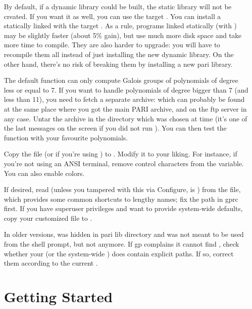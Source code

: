 By default, if a dynamic library  could be built, the static
library  will not be created. If you want it as well, you can
use the target . You can install a statically
linked  with the target . As a rule,
programs linked statically (with ) may be slightly faster
(about 5\% gain), but use much more disk space and take more time to compile.
They are also harder to upgrade: you will have to recompile them all instead
of just installing the new dynamic library. On the other hand, there's no
risk of breaking them by installing a new pari library.

 The default  function can only
compute Galois groups of polynomials of degree less or equal to 7. If you
want to handle polynomials of degree bigger than 7 (and less than 11), you
need to fetch a separate archive:  which can probably be
found at the same place where you got the main PARI archive, and on the
 ftp server in any case. Untar the archive in the 
directory which was chosen at  time (it's one of the last
messages on the screen if you did not run ). You can then
test the  function with your favourite polynomials.

 Copy the file  (or
 if you're using ) to . Modify
it to your liking. For instance, if you're not using an ANSI terminal,
remove control characters from the  variable. You can also
enable colors. 

If desired, read  (unless you tampered with this via
Configure,  is ) from the 
file, which provides some common shortcuts to lengthy names; fix the path in
gprc first. If you have superuser privileges and want to provide system-wide
defaults, copy your customized  file to .

In older versions,  was hidden in pari lib directory and was not
meant to be used from the shell prompt, but not anymore. If gp complains it
cannot find , check whether your  (or the system-wide
) does contain explicit paths. If so, correct them according to the
current .

\section{Getting Started}

